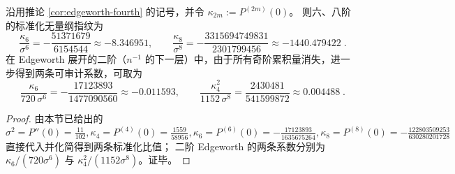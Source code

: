 \begin{corollary}\label{cor:edgeworth-six-eight}
沿用推论 \ref{cor:edgeworth-fourth} 的记号，并令
\(
\kappa_{2m}:=P^{(2m)}(0)
\)。
则六、八阶的标准化无量纲指纹为
$$
\boxed{\;
\frac{\kappa_6}{\sigma^6}=-\frac{51371679}{6154544}\approx -8.346951,
\qquad
\frac{\kappa_8}{\sigma^8}=-\frac{3315694749831}{2301799456}\approx -1440.479422\; }.
$$
在 Edgeworth 展开的二阶（\(n^{-1}\) 的下一层）中，由于所有奇阶累积量消失，进一步得到两条可审计系数，可取为
$$
\boxed{\;
\frac{\kappa_6}{720\,\sigma^6}=-\frac{17123893}{1477090560}\approx -0.011593,
\qquad
\frac{\kappa_4^2}{1152\,\sigma^8}=\frac{2430481}{541599872}\approx 0.004488\; }.
$$
\end{corollary}
\begin{proof}
由本节已给出的
\(
\sigma^2=P''(0)=\frac{11}{102},
\kappa_4=P^{(4)}(0)=\frac{1559}{58956},
\kappa_6=P^{(6)}(0)=-\frac{17123893}{1635675264},
\kappa_8=P^{(8)}(0)=-\frac{122803509253}{630280201728}
\)
直接代入并化简得到两条标准化比值；
二阶 Edgeworth 的两条系数分别为 \(\kappa_6/(720\sigma^6)\) 与 \(\kappa_4^2/(1152\sigma^8)\)。证毕。
\end{proof}

